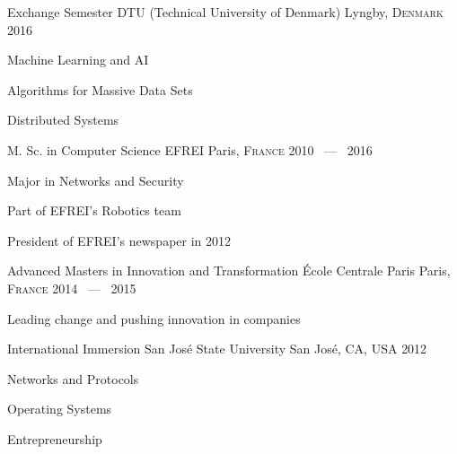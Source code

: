

\begin{cventries}

  \cventry
    {Exchange Semester}
    {DTU (Technical University of Denmark)}
    {Lyngby, \textsc{Denmark} \emojiflagdk}
    {2016}
    {
      \begin{cvitems}
        \item {Machine Learning and AI}
        \item {Algorithms for Massive Data Sets}
        \item {Distributed Systems}
      \end{cvitems}
    }

  \cventry
    {M. Sc. in Computer Science} %
    {EFREI} %
    {Paris, \textsc{France} \emojiflagfr} %
    {2010 ~---~ 2016} %
    {
      \begin{cvitems} %
        \item {Major in Networks and Security}
        \item {Part of EFREI's Robotics team}
        \item {President of EFREI's newspaper in 2012}
      \end{cvitems}
    }

  \cventry
    {Advanced Masters in Innovation and Transformation}
    {École Centrale Paris}
    {Paris, \textsc{France} \emojiflagfr}
    {2014 ~---~ 2015}
    {
      \begin{cvitems}
        \item {Leading change and pushing innovation in companies}
      \end{cvitems}
    }

  \cventry
    {International Immersion}
    {San José State University}
    {San José, CA, USA \emojiflagus}
    {2012}
    {
      \begin{cvitems}
        \item {Networks and Protocols}
        \item {Operating Systems}
        \item {Entrepreneurship}
      \end{cvitems}
    }

\end{cventries}
